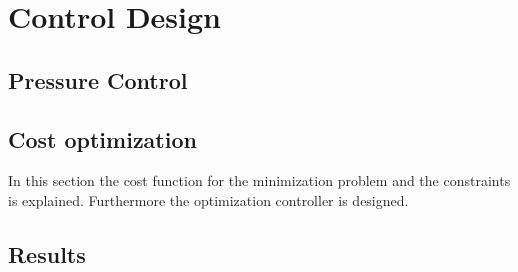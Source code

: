 \part{Control Design}
\label{control_design}

\chapter{Pressure Control}
\label{pressure_control}



\chapter{Cost optimization}
\label{Cost_optimization}

In this section the cost function for the minimization problem and the constraints is explained. Furthermore the optimization controller is designed. 




\chapter{Results}
\label{results}

